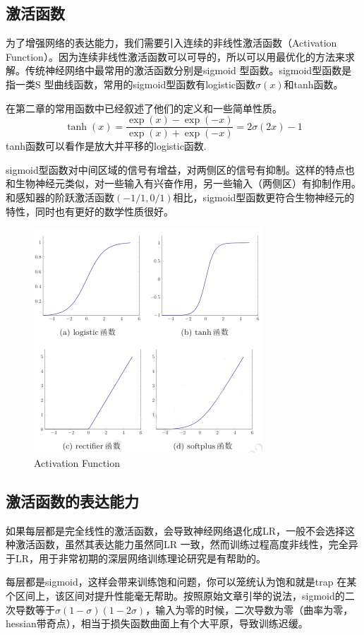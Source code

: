 \documentclass[11pt,fleqn, UTF8]{ctexbook} %
\begin{document}
\subsection{激活函数}
为了增强网络的表达能力，我们需要引入连续的非线性激活函数（Activation Function）。因为连续非线性激活函数可以可导的，所以可以用最优化的方法来求解。传统神经网络中最常用的激活函数分别是sigmoid 型函数。sigmoid型函数是指一类S 型曲线函数，常用的sigmoid型函数有logistic函数$\sigma(x)$和tanh函数。

在第二章的常用函数中已经叙述了他们的定义和一些简单性质。
\begin{equation*}
  \tanh(x)=\frac{\exp{(x)}-\exp{(-x)}}{\exp{(x)}+\exp{(-x)}}=2\sigma(2x)-1
\end{equation*}
tanh函数可以看作是放大并平移的logistic函数.

sigmoid型函数对中间区域的信号有增益，对两侧区的信号有抑制。这样的特点也和生物神经元类似，对一些输入有兴奋作用，另一些输入（两侧区）有抑制作用。和感知器的阶跃激活函数$(-1/1,0/1)$相比，sigmoid型函数更符合生物神经元的特性，同时也有更好的数学性质很好。
\begin{figure}[t]
 \centering
 \includegraphics{pics/52.png}
 \caption{Activation Function}
 \label{fig:5.2}
\end{figure}
\subsection{激活函数的表达能力}
如果每层都是完全线性的激活函数，会导致神经网络退化成LR，一般不会选择这种激活函数，虽然其表达能力虽然同LR 一致，然而训练过程高度非线性，完全异于LR，用于非常初期的深层网络训练理论研究是有帮助的。

每层都是sigmoid，这样会带来训练饱和问题\cite{glorot2010understanding}，你可以笼统认为饱和就是trap 在某个区间上，该区间对提升性能毫无帮助。按照原始文章引举的说法，sigmoid的二次导数等于$\sigma(1-\sigma)(1-2\sigma)$，输入为零的时候，二次导数为零（曲率为零，hessian带奇点），相当于损失函数曲面上有个大平原，导致训练迟缓。
\end{document}
